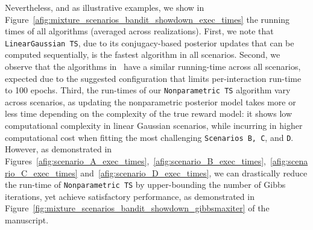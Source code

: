 Nevertheless, and as illustrative examples, we show in Figure~\ref{afig:mixture_scenarios_bandit_showdown_exec_times} the running times of all algorithms (averaged across realizations).
First, we note that \texttt{LinearGaussian TS}, due to its conjugacy-based posterior updates that can be computed sequentially, is the fastest algorithm in all scenarios.
Second, we observe that the algorithms in~\cite{ip-Riquelme2018} have a similar running-time across all scenarios, expected due to the suggested configuration that limits per-interaction run-time to 100 epochs.
Third, the run-times of our \texttt{Nonparametric TS} algorithm vary across scenarios, as updating the nonparametric posterior model takes more or less time depending on the complexity of the true reward model: it shows low computational complexity in linear Gaussian scenarios, while incurring in higher computational cost when fitting the most challenging \texttt{Scenarios B, C}, and \texttt{D}.
However, as demonstrated in Figures~\ref{afig:scenario_A_exec_times},~\ref{afig:scenario_B_exec_times},~\ref{afig:scenario_C_exec_times} and~\ref{afig:scenario_D_exec_times}, we can drastically reduce the run-time of \texttt{Nonparametric TS} by upper-bounding the number of Gibbs iterations, yet achieve satisfactory performance, as demonstrated in Figure~\ref{fig:mixture_scenarios_bandit_showdown_gibbsmaxiter} of the manuscript.

